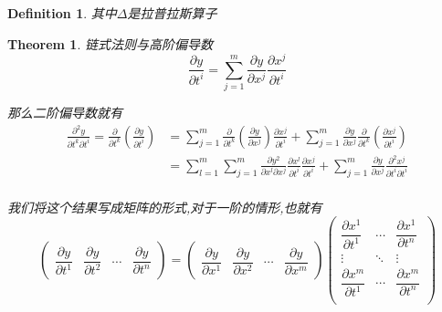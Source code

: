 \documentclass[11pt,hyperref,a4paper,UTF8]{ctexart}
\newtheorem{theorem}{Theorem}[subsection]
\newtheorem{definition}{Definition}[subsection]
\newcommand{\parameter}[1]{\left(#1\right)}
\begin{document}
\begin{CJK}{UTF8}{gkai}
\begin{definition}
  其中$\Delta$是拉普拉斯算子
\end{definition}

\begin{theorem}
  链式法则与高阶偏导数\\

  \[\frac{\partial y}{\partial t^i} = 
  \sum_{j = 1}^{m} \frac{\partial y}{\partial x^j}\frac{\partial x^j}{\partial t^i}\]

  那么二阶偏导数就有
  \[
  \begin{aligned}  
    \frac{\partial^2 y}{\partial t^k \partial t^i} = \frac{\partial}{\partial t^k}\parameter{\frac{\partial y}{\partial t^i}} &= \sum_{j = 1}^{m}  \frac{\partial}{\partial t^k}\parameter{\frac{\partial y}{\partial x^j}}\frac{\partial x^j}{\partial t^i} +\sum_{j = 1}^{m} \frac{\partial y}{\partial x^j} \frac{\partial}{\partial t^k}\parameter{\frac{\partial x^j}{\partial t^i}} \\
    &= \sum_{l = 1}^{m}\sum_{j = 1}^{m} \frac{\partial y^2}{\partial x^l \partial x^j} \frac{\partial x^l}{\partial t^i}\frac{\partial x^j}{\partial t^i} + \sum_{j = 1}^{m} \frac{\partial y}{\partial x^j} \frac{\partial^2 x^j}{\partial t^i \partial t^i}\\
  \end{aligned}  
  \]

  我们将这个结果写成矩阵的形式,对于一阶的情形,也就有
  \[\begin{pmatrix}
    \dfrac{\partial y}{\partial t^1}&\dfrac{\partial y}{\partial t^2}&\cdots&\dfrac{\partial y}{\partial t^n}
  \end{pmatrix} = \begin{pmatrix}
    \dfrac{\partial y}{\partial x^1}&\dfrac{\partial y}{\partial x^2}&\cdots&\dfrac{\partial y}{\partial x^m}
  \end{pmatrix} \begin{pmatrix}
    \dfrac{\partial x^1}{\partial t^1}&\cdots&\dfrac{\partial x^1}{\partial t^n}\\
    \vdots&\ddots&\vdots\\
    \dfrac{\partial x^m}{\partial t^1}&\cdots&\dfrac{\partial x^m}{\partial t^n}\\
  \end{pmatrix}\]


\end{theorem}
\end{CJK}
\end{document}
